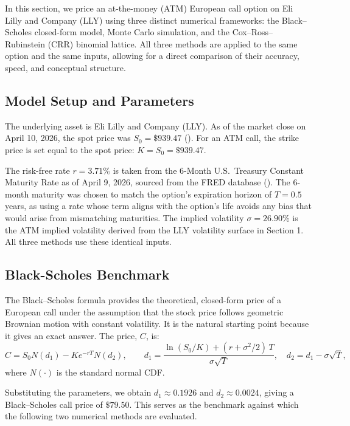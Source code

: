 \documentclass[12pt, a4paper]{article}
\begin{document}
In this section, we price an at-the-money (ATM) European call option on Eli Lilly and Company (LLY) using three distinct numerical frameworks: the Black--Scholes closed-form model, Monte Carlo simulation, and the Cox--Ross--Rubinstein (CRR) binomial lattice. All three methods are applied to the same option and the same inputs, allowing for a direct comparison of their accuracy, speed, and conceptual structure.
 
\subsection{Model Setup and Parameters}
 
The underlying asset is Eli Lilly and Company (LLY). As of the market close on April 10, 2026, the spot price was $S_0 = \$939.47$ (\cite{YAHOO_LLY_Q2}). For an ATM call, the strike price is set equal to the spot price: $K = S_0 = \$939.47$.
 
The risk-free rate $r = 3.71\%$ is taken from the 6-Month U.S.\ Treasury Constant
Maturity Rate as of April 9, 2026, sourced from the FRED database (\cite{FRED_DGS6MO_Q2}). The 6-month maturity was chosen to
match the option's expiration horizon of $T = 0.5$ years, as using a rate whose term aligns with the option's life avoids any bias that would arise from mismatching maturities. The implied volatility $\sigma = 26.90\%$ is the ATM implied volatility derived from the LLY volatility surface in Section 1. All three methods use these identical inputs.
 
\subsection{Black-Scholes Benchmark}
\label{sec:q2_bs}
 
The Black--Scholes formula provides the theoretical, closed-form price of a European call under the assumption that the stock price follows geometric Brownian motion with constant volatility. It is the natural starting point because it gives an exact answer. The price, $C$, is:
\begin{equation}
    C = S_0 N(d_1) - K e^{-rT} N(d_2), \qquad
    d_1 = \frac{\ln(S_0/K) + (r + \sigma^2/2)\,T}{\sigma\sqrt{T}}, \quad
    d_2 = d_1 - \sigma\sqrt{T},
    \label{eq:bs_q2}
\end{equation}
where $N(\cdot)$ is the standard normal CDF.
 
Substituting the parameters, we obtain $d_1 \approx 0.1926$ and $d_2 \approx 0.0024$,
giving a Black--Scholes call price of $\$79.50$. This serves as the benchmark
against which the following two numerical methods are evaluated.
 
\end{document}
